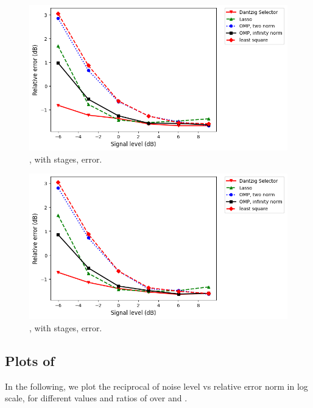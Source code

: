 \begin {figure} [H]
\includegraphics [width = \textwidth] {error-medium-tall-four.png}
\caption {, with  stages, error.}
\end {figure}

\begin {figure} [H]
\includegraphics [width = \textwidth] {error-medium-wide-four.png}
\caption {, with  stages, error.}
\end {figure}


\subsection {Plots of }

In the following, we plot the reciprocal of noise level vs relative error norm in log scale, for different values and ratios of  over  and .

